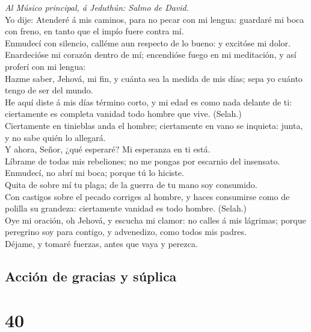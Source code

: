  \emph{Al Músico principal, á Jeduthún: Salmo de David.}\\
Yo dije: Atenderé á mis caminos, para no pecar con mi lengua: guardaré
mi boca con freno, en tanto que el impío fuere contra mí.\\
 Enmudecí con silencio, calléme aun respecto de lo bueno: y
excitóse mi dolor.\\
 Enardecióse mi corazón dentro de mí; encendióse fuego en mi
meditación, y así proferí con mi lengua:\\
 Hazme saber, Jehová, mi fin, y cuánta sea la medida de mis
días; sepa yo cuánto tengo de ser del mundo.\\
 He aquí diste á mis días término corto, y mi edad es como
nada delante de ti: ciertamente es completa vanidad todo hombre que
vive. (Selah.)\\
 Ciertamente en tinieblas anda el hombre; ciertamente en
vano se inquieta: junta, y no sabe quién lo allegará.\\
 Y ahora, Señor, ¿qué esperaré? Mi esperanza en ti está.\\
 Líbrame de todas mis rebeliones; no me pongas por escarnio
del insensato.\\
 Enmudecí, no abrí mi boca; porque tú lo hiciste.\\
 Quita de sobre mí tu plaga; de la guerra de tu mano soy
consumido.\\
 Con castigos sobre el pecado corriges al hombre, y haces
consumirse como de polilla su grandeza: ciertamente vanidad es todo
hombre. (Selah.)\\
 Oye mi oración, oh Jehová, y escucha mi clamor: no calles
á mis lágrimas; porque peregrino soy para contigo, y advenedizo, como
todos mis padres.\\
 Déjame, y tomaré fuerzas, antes que vaya y perezca.

\hypertarget{acciuxf3n-de-gracias-y-suxfaplica}{%
\subsection{Acción de gracias y
súplica}\label{acciuxf3n-de-gracias-y-suxfaplica}}

\hypertarget{section-39}{%
\section{40}\label{section-39}}


